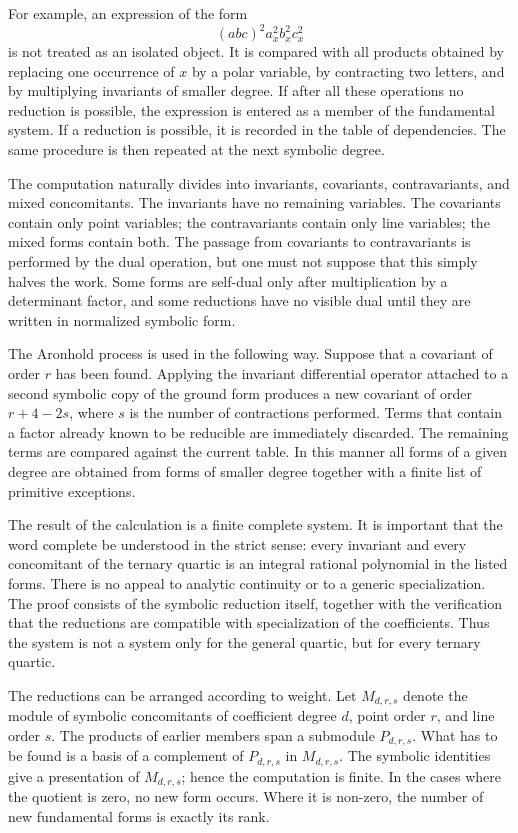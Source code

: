 \documentclass[12pt]{article}
\begin{document}
For example, an expression of the form \[   (abc)^2 a_x^2 b_x^2 c_x^2 \] is not treated as an
isolated object. It is compared with all products obtained by replacing one occurrence of \(x\) by a
polar variable, by contracting two letters, and by multiplying invariants of smaller degree. If
after all these operations no reduction is possible, the expression is entered as a member of the
fundamental system. If a reduction is possible, it is recorded in the table of dependencies. The
same procedure is then repeated at the next symbolic degree.


The computation naturally divides into invariants, covariants, contravariants, and mixed
concomitants. The invariants have no remaining variables. The covariants contain only point
variables; the contravariants contain only line variables; the mixed forms contain both. The passage
from covariants to contravariants is performed by the dual operation, but one must not suppose that
this simply halves the work. Some forms are self-dual only after multiplication by a determinant
factor, and some reductions have no visible dual until they are written in normalized symbolic form.


The Aronhold process is used in the following way. Suppose that a covariant of order \(r\) has been
found. Applying the invariant differential operator attached to a second symbolic copy of the ground
form produces a new covariant of order \(r+4-2s\), where \(s\) is the number of contractions
performed. Terms that contain a factor already known to be reducible are immediately discarded. The
remaining terms are compared against the current table. In this manner all forms of a given degree
are obtained from forms of smaller degree together with a finite list of primitive exceptions.


The result of the calculation is a finite complete system. It is important that the word complete be
understood in the strict sense: every invariant and every concomitant of the ternary quartic is an
integral rational polynomial in the listed forms. There is no appeal to analytic continuity or to a
generic specialization. The proof consists of the symbolic reduction itself, together with the
verification that the reductions are compatible with specialization of the coefficients. Thus the
system is not a system only for the general quartic, but for every ternary quartic.


The reductions can be arranged according to weight. Let \(M_{d,r,s}\) denote the module of symbolic
concomitants of coefficient degree \(d\), point order \(r\), and line order \(s\). The products of
earlier members span a submodule \(P_{d,r,s}\). What has to be found is a basis of a complement of
\(P_{d,r,s}\) in \(M_{d,r,s}\). The symbolic identities give a presentation of \(M_{d,r,s}\); hence
the computation is finite. In the cases where the quotient is zero, no new form occurs. Where it is
non-zero, the number of new fundamental forms is exactly its rank.
\end{document}
